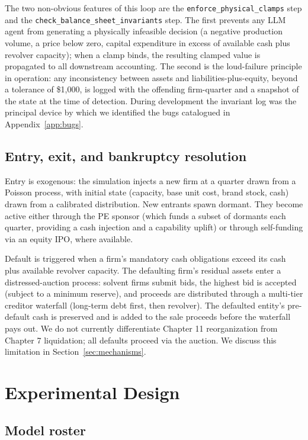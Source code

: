 \documentclass[11pt]{article}
\begin{document}
The two non-obvious features of this loop are the
\texttt{enforce\_physical\_clamps} step and the
\texttt{check\_balance\_sheet\_invariants} step. The first prevents
any LLM agent from generating a physically infeasible decision (a
negative production volume, a price below zero, capital expenditure
in excess of available cash plus revolver capacity); when a clamp
binds, the resulting clamped value is propagated to all downstream
accounting. The second is the loud-failure principle in operation:
any inconsistency between assets and liabilities-plus-equity, beyond
a tolerance of \$1{,}000, is logged with the offending firm-quarter
and a snapshot of the state at the time of detection. During
development the invariant log was the principal device by which we
identified the bugs catalogued in Appendix~\ref{app:bugs}.

\subsection{Entry, exit, and bankruptcy resolution}\label{sec:bankruptcy}

Entry is exogenous: the simulation injects a new firm at a quarter drawn
from a Poisson process, with initial state (capacity, base unit cost,
brand stock, cash) drawn from a calibrated distribution. New entrants
spawn dormant. They become active either through the PE sponsor (which
funds a subset of dormants each quarter, providing a cash injection and
a capability uplift) or through self-funding via an equity IPO, where
available.

Default is triggered when a firm's mandatory cash obligations exceed its
cash plus available revolver capacity. The defaulting firm's residual
assets enter a distressed-auction process: solvent firms submit bids,
the highest bid is accepted (subject to a minimum reserve), and proceeds
are distributed through a multi-tier creditor waterfall (long-term debt
first, then revolver). The defaulted entity's pre-default cash is
preserved and is added to the sale proceeds before the waterfall pays
out. We do not currently differentiate Chapter 11 reorganization from
Chapter 7 liquidation; all defaults proceed via the auction. We discuss
this limitation in Section~\ref{sec:mechanisms}.

\section{Experimental Design}\label{sec:design}

\subsection{Model roster}
\end{document}
